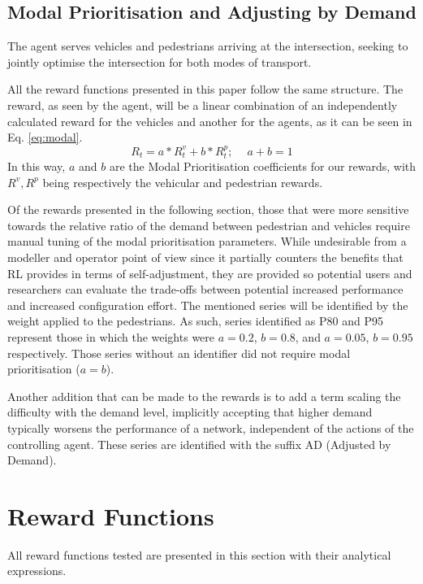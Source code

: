 \documentclass[sigconf,anonymous]{aamas}
\begin{document}
\subsection{Modal Prioritisation and Adjusting by Demand}
The agent serves vehicles and pedestrians arriving at the intersection, seeking to jointly optimise the intersection for both modes of transport.

All the reward functions presented in this paper follow the same structure.
The reward, as seen by the agent, will be a linear combination of an independently calculated reward for the vehicles and another for the agents, as it can be seen in Eq. \ref{eq:modal}.
\begin{equation}
R_t = a * R^v_t + b * R^p_t;\,\,\,\,\,\,\ a+b = 1
\label{eq:modal}
\end{equation}
In this way, $a$ and $b$ are the Modal Prioritisation coefficients for our rewards, with $R^v, R^p$ being respectively the vehicular and pedestrian rewards.

Of the rewards presented in the following section, those that were more sensitive towards the relative ratio of the demand between pedestrian and vehicles require manual tuning of the modal prioritisation parameters.
While undesirable from a modeller and operator point of view since it partially counters the benefits that RL provides in terms of self-adjustment, they are provided so potential users and researchers can evaluate the trade-offs between potential increased performance and increased configuration effort.
The mentioned series will be identified by the weight applied to the pedestrians.
As such, series identified as P80 and P95 represent those in which the weights were $a=0.2$, $b=0.8$, and $a=0.05$, $b=0.95$ respectively. 
Those series without an identifier did not require modal prioritisation ($a = b$).

Another addition that can be made to the rewards is to add a term scaling the difficulty with the demand level, implicitly accepting that higher demand typically worsens the performance of a network, independent of the actions of the controlling agent.
These series are identified with the suffix AD (Adjusted by Demand).
\section{Reward Functions}
\label{rewards}
All reward functions tested are presented in this section with their analytical expressions.
\end{document}
